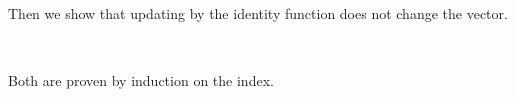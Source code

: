 Then we show that updating by the identity function does not change the vector.
\begin{code}%
\>[0]\AgdaSpace{}%
\AgdaSymbol{:}\AgdaSpace{}%
\AgdaSpace{}%
\AgdaSymbol{\{}\AgdaSymbol{\}}\AgdaSpace{}%
\AgdaSymbol{\{}\AgdaSpace{}%
\AgdaSymbol{:}\AgdaSpace{}%
\AgdaSpace{}%
\AgdaSpace{}%
\AgdaSymbol{\}}\AgdaSpace{}%
\AgdaSymbol{\{}\AgdaSpace{}%
\AgdaSymbol{:}\AgdaSpace{}%
\AgdaSpace{}%
\AgdaSymbol{\}}\AgdaSpace{}%
\AgdaSpace{}%
\AgdaSpace{}%
\AgdaOperator{\AgdaFunction{[}}\AgdaSpace{}%
\AgdaSpace{}%
\AgdaOperator{\AgdaFunction{]\%=}}\AgdaSpace{}%
\AgdaSpace{}%
\AgdaSpace{}%
\<%
\end{code}
\begin{code}[hide]%
\>[0]\AgdaSpace{}%
\AgdaSymbol{\{}\AgdaSymbol{\}}\AgdaSpace{}%
\AgdaSymbol{\{}\AgdaSpace{}%
\AgdaSpace{}%
\AgdaSymbol{\}}\AgdaSpace{}%
\AgdaSymbol{\{}\AgdaSymbol{\}}%
\>[28]\AgdaSymbol{=}\AgdaSpace{}%
\<%
\\
\>[0]\AgdaSpace{}%
\AgdaSymbol{\{}\AgdaSymbol{\}}\AgdaSpace{}%
\AgdaSymbol{\{}\AgdaSpace{}%
\AgdaSpace{}%
\AgdaSymbol{\AgdaUnderscore{}\}}\AgdaSpace{}%
\AgdaSymbol{\{}\AgdaSpace{}%
\AgdaSymbol{\}}\AgdaSpace{}%
\AgdaSymbol{=}\AgdaSpace{}%
\AgdaSpace{}%
\AgdaSymbol{(}\AgdaSpace{}%
\AgdaSymbol{)}\AgdaSpace{}%
\<%
\end{code}

Both are proven by induction on the index.

